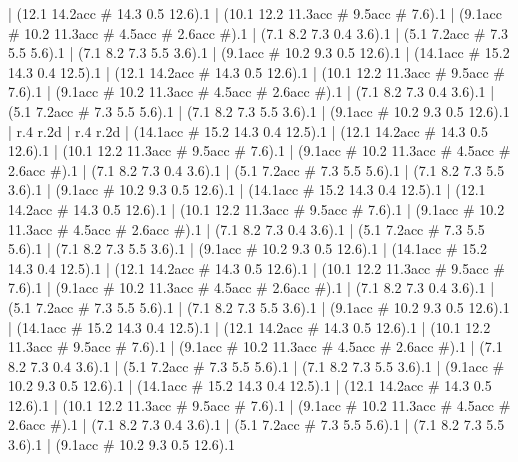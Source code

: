     |
      (12.1 14.2{acc #} 14.3 0.5 12.6).1
    |
      (10.1 12.2 11.3{acc #} 9.5{acc #} 7.6).1
    |
      (9.1{acc #} 10.2 11.3{acc #} 4.5{acc #} 2.6{acc #}).1
    |
      (7.1 8.2 7.3 0.4 3.6).1
    |
      (5.1 7.2{acc #} 7.3 5.5 5.6).1
    |
      (7.1 8.2 7.3 5.5 3.6).1
    |
      (9.1{acc #} 10.2 9.3 0.5 12.6).1
    |
      (14.1{acc #} 15.2 14.3 0.4 12.5).1
    |
      (12.1 14.2{acc #} 14.3 0.5 12.6).1
    |
      (10.1 12.2 11.3{acc #} 9.5{acc #} 7.6).1
    |
      (9.1{acc #} 10.2 11.3{acc #} 4.5{acc #} 2.6{acc #}).1
    |
      (7.1 8.2 7.3 0.4 3.6).1
    |
      (5.1 7.2{acc #} 7.3 5.5 5.6).1
    |
      (7.1 8.2 7.3 5.5 3.6).1
    |
      (9.1{acc #} 10.2 9.3 0.5 12.6).1
    |
      r.4
      r.2{d}
    |
      r.4
      r.2{d}
    |
      (14.1{acc #} 15.2 14.3 0.4 12.5).1
    |
      (12.1 14.2{acc #} 14.3 0.5 12.6).1
    |
      (10.1 12.2 11.3{acc #} 9.5{acc #} 7.6).1
    |
      (9.1{acc #} 10.2 11.3{acc #} 4.5{acc #} 2.6{acc #}).1
    |
      (7.1 8.2 7.3 0.4 3.6).1
    |
      (5.1 7.2{acc #} 7.3 5.5 5.6).1
    |
      (7.1 8.2 7.3 5.5 3.6).1
    |
      (9.1{acc #} 10.2 9.3 0.5 12.6).1
    |
      (14.1{acc #} 15.2 14.3 0.4 12.5).1
    |
      (12.1 14.2{acc #} 14.3 0.5 12.6).1
    |
      (10.1 12.2 11.3{acc #} 9.5{acc #} 7.6).1
    |
      (9.1{acc #} 10.2 11.3{acc #} 4.5{acc #} 2.6{acc #}).1
    |
      (7.1 8.2 7.3 0.4 3.6).1
    |
      (5.1 7.2{acc #} 7.3 5.5 5.6).1
    |
      (7.1 8.2 7.3 5.5 3.6).1
    |
      (9.1{acc #} 10.2 9.3 0.5 12.6).1
    |
      (14.1{acc #} 15.2 14.3 0.4 12.5).1
    |
      (12.1 14.2{acc #} 14.3 0.5 12.6).1
    |
      (10.1 12.2 11.3{acc #} 9.5{acc #} 7.6).1
    |
      (9.1{acc #} 10.2 11.3{acc #} 4.5{acc #} 2.6{acc #}).1
    |
      (7.1 8.2 7.3 0.4 3.6).1
    |
      (5.1 7.2{acc #} 7.3 5.5 5.6).1
    |
      (7.1 8.2 7.3 5.5 3.6).1
    |
      (9.1{acc #} 10.2 9.3 0.5 12.6).1
    |
      (14.1{acc #} 15.2 14.3 0.4 12.5).1
    |
      (12.1 14.2{acc #} 14.3 0.5 12.6).1
    |
      (10.1 12.2 11.3{acc #} 9.5{acc #} 7.6).1
    |
      (9.1{acc #} 10.2 11.3{acc #} 4.5{acc #} 2.6{acc #}).1
    |
      (7.1 8.2 7.3 0.4 3.6).1
    |
      (5.1 7.2{acc #} 7.3 5.5 5.6).1
    |
      (7.1 8.2 7.3 5.5 3.6).1
    |
      (9.1{acc #} 10.2 9.3 0.5 12.6).1
    |
      (14.1{acc #} 15.2 14.3 0.4 12.5).1
    |
      (12.1 14.2{acc #} 14.3 0.5 12.6).1
    |
      (10.1 12.2 11.3{acc #} 9.5{acc #} 7.6).1
    |
      (9.1{acc #} 10.2 11.3{acc #} 4.5{acc #} 2.6{acc #}).1
    |
      (7.1 8.2 7.3 0.4 3.6).1
    |
      (5.1 7.2{acc #} 7.3 5.5 5.6).1
    |
      (7.1 8.2 7.3 5.5 3.6).1
    |
      (9.1{acc #} 10.2 9.3 0.5 12.6).1
